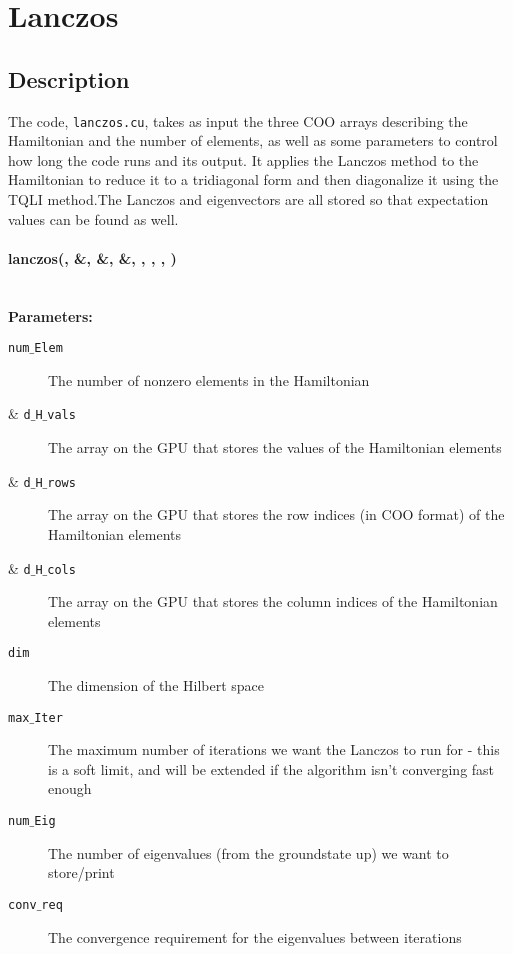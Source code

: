 \documentclass{article}
\begin{document}
\section{Lanczos}

\subsection{Description}
The code, \texttt{lanczos.cu}, takes as input the three COO arrays describing the Hamiltonian and the number of elements, as well as some parameters to control how long the code runs and its output. 
It applies the Lanczos method to the Hamiltonian to reduce it to a tridiagonal form and then diagonalize it using the TQLI method.The Lanczos and eigenvectors are all stored so that expectation values can be found as well.  

\paragraph{\host \void lanczos(\const \int , \const \cuDoubleComplex \&, \const \ptrint \&, \const \ptrint \&, \const \int , \int , \const \int , \const \double )\\ \\ }

\noindent\textbf{Parameters:}
\begin{description}
\item[\const \int \texttt{num$\_$Elem}]{The number of nonzero elements in the Hamiltonian}
\item[\const \cuDoubleComplex \& \texttt{d$\_$H$\_$vals} ]{The array on the GPU that stores the values of the Hamiltonian elements}
\item[\const \ptrint \& \texttt{d$\_$H$\_$rows}]{The array on the GPU that stores the row indices (in COO format) of the Hamiltonian elements}
\item[\const \ptrint \& \texttt{d$\_$H$\_$cols}]{The array on the GPU that stores the column indices of the Hamiltonian elements}
\item[\const \ptrint \texttt{dim}]{The dimension of the Hilbert space}
\item[\int \texttt{max$\_$Iter}]{The maximum number of iterations we want the Lanczos to run for - this is a soft limit, and will be extended if the algorithm isn't converging fast enough}
\item[\const \int \texttt{num$\_$Eig}]{The number of eigenvalues (from the groundstate up) we want to store/print}
\item[\const \double \texttt{conv$\_$req}]{The convergence requirement for the eigenvalues between iterations}
\end{description}
\end{document}
